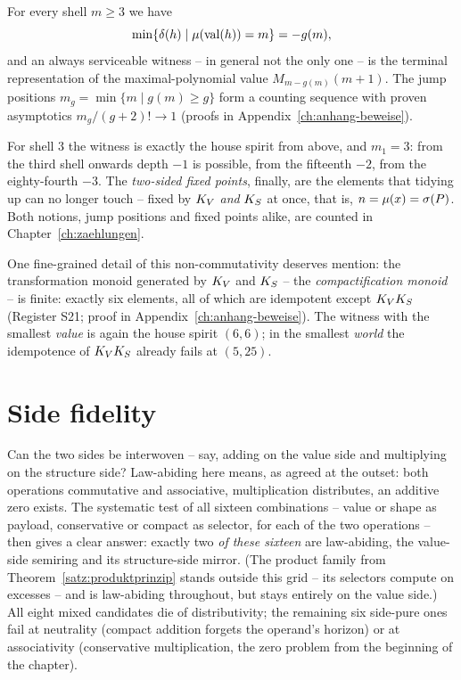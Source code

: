 \begin{satz}
\label{satz:tiefengesetz}
For every shell $m\ge3$ we have
\[
\min\{\delta(h)\mid \mu(\operatorname{val}(h))=m\}=-g(m),
\]
and an always serviceable witness -- in general not the only
one -- is the terminal representation of the maximal-polynomial
value $M_{m-g(m)}(m{+}1)$. The jump positions
$m_g=\min\{m\mid g(m)\ge g\}$
form a counting sequence with proven asymptotics
$m_g/(g{+}2)!\to1$ (proofs in Appendix~\ref{ch:anhang-beweise}).
\end{satz}

For shell $3$ the witness is exactly the house spirit from above,
and $m_1=3$: from the third shell onwards depth $-1$ is possible,
from the fifteenth $-2$, from the eighty-fourth $-3$. The
\emph{two-sided fixed points}, finally, are the elements that
tidying up can no longer touch -- fixed by $K_V$
\emph{and} $K_S$ at once, that is, $n=\mu(x)=\sigma(P)$. Both
notions, jump positions and fixed points alike, are counted in
Chapter~\ref{ch:zaehlungen}.

One fine-grained detail of this non-commutativity deserves mention:
the transformation monoid generated by $K_V$ and $K_S$ -- the
\emph{compactification monoid} -- is finite: exactly six elements,
all of which are idempotent except $K_VK_S$
(Register S21; proof in Appendix~\ref{ch:anhang-beweise}). The
witness with the smallest \emph{value} is again the house spirit
$(6,6)$; in the smallest \emph{world} the idempotence of
$K_VK_S$ already fails at $(5,25)$.

\section{Side fidelity}
\label{sec:seitentreue}

Can the two sides be interwoven -- say, adding on the value side
and multiplying on the structure side? Law-abiding here means, as
agreed at the outset: both operations commutative and associative,
multiplication distributes, an additive zero exists. The systematic
test of all sixteen combinations -- value or shape as payload,
conservative or compact as selector, for each of the two
operations -- then gives a clear answer: exactly two \emph{of these
sixteen} are law-abiding, the value-side semiring and its
structure-side mirror. (The product family from
Theorem~\ref{satz:produktprinzip} stands outside this grid -- its
selectors compute on excesses -- and is law-abiding throughout, but
stays entirely on the value side.) All eight mixed candidates die
of distributivity; the remaining six side-pure ones fail at
neutrality (compact addition forgets the operand's horizon) or at
associativity (conservative multiplication, the zero problem from
the beginning of the chapter).

